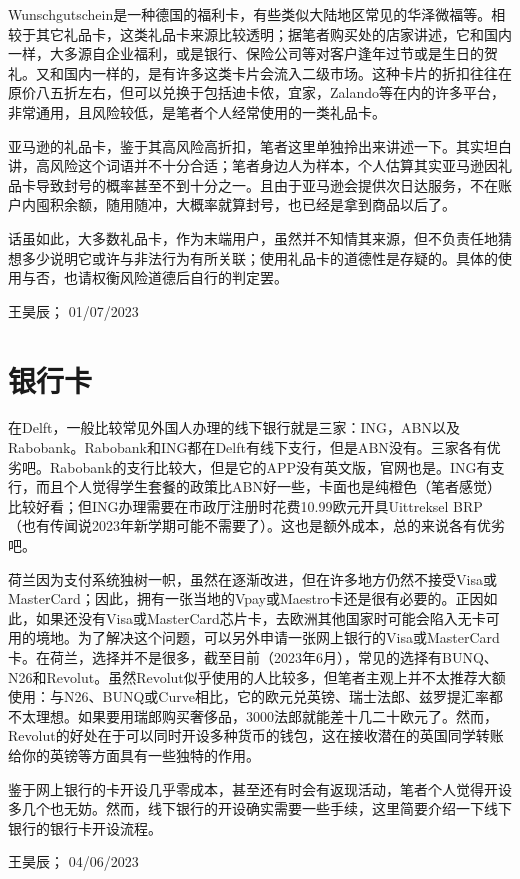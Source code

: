 Wunschgutschein是一种德国的福利卡，有些类似大陆地区常见的华泽微福等。相较于其它礼品卡，这类礼品卡来源比较透明；据笔者购买处的店家讲述，它和国内一样，大多源自企业福利，或是银行、保险公司等对客户逢年过节或是生日的贺礼。又和国内一样的，是有许多这类卡片会流入二级市场。这种卡片的折扣往往在原价八五折左右，但可以兑换于包括迪卡侬，宜家，Zalando等在内的许多平台，非常通用，且风险较低，是笔者个人经常使用的一类礼品卡。

亚马逊的礼品卡，鉴于其高风险高折扣，笔者这里单独拎出来讲述一下。其实坦白讲，高风险这个词语并不十分合适；笔者身边人为样本，个人估算其实亚马逊因礼品卡导致封号的概率甚至不到十分之一。且由于亚马逊会提供次日达服务，不在账户内囤积余额，随用随冲，大概率就算封号，也已经是拿到商品以后了。

话虽如此，大多数礼品卡，作为末端用户，虽然并不知情其来源，但不负责任地猜想多少说明它或许与非法行为有所关联；使用礼品卡的道德性是存疑的。具体的使用与否，也请权衡风险道德后自行的判定罢。
\begin{flushright}
王昊辰； 01/07/2023
\end{flushright}

\vspace{\betsubsec} %
\section{银行卡}
在Delft，一般比较常见外国人办理的线下银行就是三家：ING，ABN以及Rabobank。Rabobank和ING都在Delft有线下支行，但是ABN没有。三家各有优劣吧。Rabobank的支行比较大，但是它的APP没有英文版，官网也是。ING有支行，而且个人觉得学生套餐的政策比ABN好一些，卡面也是纯橙色（笔者感觉）比较好看；但ING办理需要在市政厅注册时花费10.99欧元开具Uittreksel BRP （也有传闻说2023年新学期可能不需要了）。这也是额外成本，总的来说各有优劣吧。

荷兰因为支付系统独树一帜，虽然在逐渐改进，但在许多地方仍然不接受Visa或MasterCard；因此，拥有一张当地的Vpay或Maestro卡还是很有必要的。正因如此，如果还没有Visa或MasterCard芯片卡，去欧洲其他国家时可能会陷入无卡可用的境地。为了解决这个问题，可以另外申请一张网上银行的Visa或MasterCard卡。在荷兰，选择并不是很多，截至目前（2023年6月），常见的选择有BUNQ、N26和Revolut。虽然Revolut似乎使用的人比较多，但笔者主观上并不太推荐大额使用：与N26、BUNQ或Curve相比，它的欧元兑英镑、瑞士法郎、兹罗提汇率都不太理想。如果要用瑞郎购买奢侈品，3000法郎就能差十几二十欧元了。然而，Revolut的好处在于可以同时开设多种货币的钱包，这在接收潜在的英国同学转账给你的英镑等方面具有一些独特的作用。

鉴于网上银行的卡开设几乎零成本，甚至还有时会有返现活动，笔者个人觉得开设多几个也无妨。然而，线下银行的开设确实需要一些手续，这里简要介绍一下线下银行的银行卡开设流程。
\begin{flushright}
王昊辰； 04/06/2023
\end{flushright}

